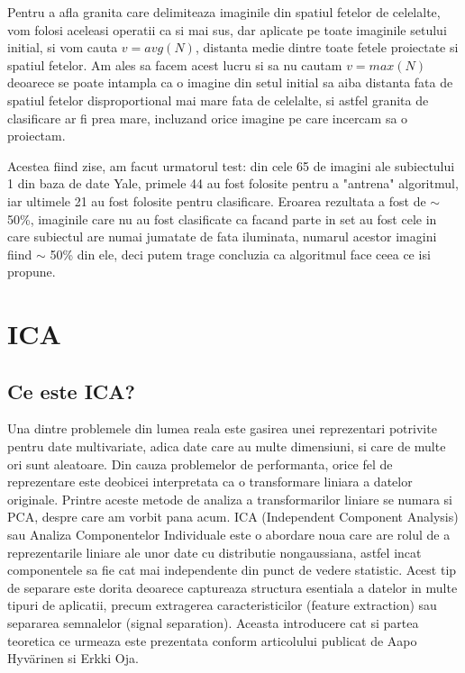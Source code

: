 \documentclass[12pt,oneside]{article}
\begin{document}
Pentru a afla granita care delimiteaza imaginile din spatiul fetelor de celelalte, vom folosi aceleasi operatii ca si mai sus, dar aplicate pe toate imaginile setului initial, si vom cauta $v=avg(N)$, distanta medie dintre toate fetele proiectate si spatiul fetelor. Am ales sa facem acest lucru si sa nu cautam $v=max(N)$ deoarece se poate intampla ca o imagine din setul initial sa aiba distanta fata de spatiul fetelor disproportional mai mare fata de celelalte, si astfel granita de clasificare ar fi prea mare, incluzand orice imagine pe care incercam sa o proiectam.

Acestea fiind zise, am facut urmatorul test: din cele 65 de imagini ale subiectului 1 din baza de date Yale, primele 44 au fost folosite pentru a "antrena" algoritmul, iar ultimele 21 au fost folosite pentru clasificare. Eroarea rezultata a fost de $\sim$ 50\%, imaginile care nu au fost clasificate ca facand parte in set au fost cele in care subiectul are numai jumatate de fata iluminata, numarul acestor imagini fiind $\sim$ 50\% din ele, deci putem trage concluzia ca algoritmul face ceea ce isi propune. 

\newpage
\section{ICA}

\subsection{Ce este ICA? }
Una dintre problemele din lumea reala este gasirea unei reprezentari potrivite pentru date multivariate, adica date care au multe dimensiuni, si care de multe ori sunt aleatoare. Din cauza problemelor de performanta, orice fel de reprezentare este deobicei interpretata ca o transformare liniara a datelor originale. Printre aceste metode de analiza a transformarilor liniare se numara si PCA, despre care am vorbit pana acum. ICA (Independent Component Analysis) sau Analiza Componentelor Individuale este o abordare noua care are rolul de a reprezentarile liniare ale unor date cu distributie nongaussiana, astfel incat componentele sa fie cat mai independente din punct de vedere statistic. Acest tip de separare este dorita deoarece captureaza structura esentiala a datelor in multe tipuri de aplicatii, precum extragerea caracteristicilor (feature extraction) sau separarea semnalelor (signal separation). Aceasta introducere cat si partea teoretica ce urmeaza este prezentata conform articolului publicat de Aapo Hyvärinen si Erkki Oja.\cite{hyvarien}
\end{document}
